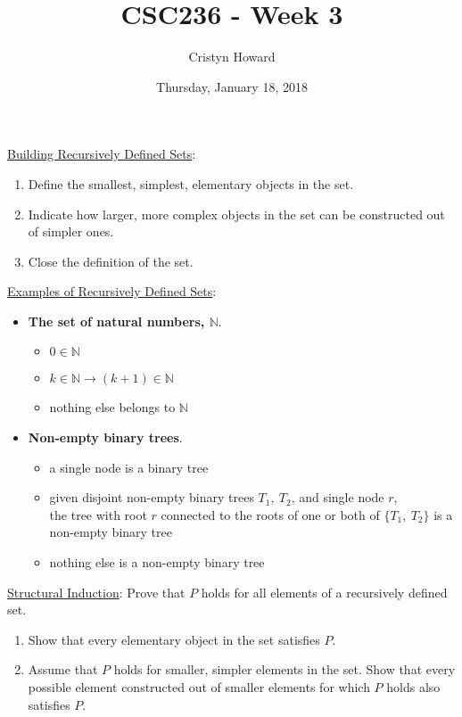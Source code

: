 \documentclass[12pt]{article}
\title{CSC236 - Week 3}
\author{Cristyn Howard}
\date{Thursday, January 18, 2018}
\begin{document}
\maketitle

\underline{Building Recursively Defined Sets}:
\begin{enumerate}
\item Define the smallest, simplest, elementary objects in the set.
\item Indicate how larger, more complex objects in the set can be constructed out of simpler ones.
\item Close the definition of the set.
\end{enumerate}
\vspace{0.5cm}

\underline{Examples of Recursively Defined Sets}:
\begin{itemize}
\item \textbf{The set of natural numbers, $\mathbb{N}$}.
	\begin{itemize}
	\item $0 \in \mathbb{N}$
	\item $k \in \mathbb{N} \rightarrow (k+1) \in \mathbb{N}$
	\item nothing else belongs to $\mathbb{N}$
	\end{itemize}

\item \textbf{Non-empty binary trees}.
	\begin{itemize}
	\item a single node is a binary tree
	\item given disjoint non-empty binary trees $T_1, \: T_2$, and single node $r$, \\ the tree with root $r$ connected to the roots of one or both of $\{T_1, \: T_2\}$ is a non-empty binary tree
	\item nothing else is a non-empty binary tree
	\end{itemize}
\end{itemize}
\vspace{0.5cm}

\underline{Structural Induction}: Prove that $P$ holds for all elements of a recursively defined set.
\begin{enumerate}
\item Show that every elementary object in the set satisfies $P$.
\item Assume that $P$ holds for smaller, simpler elements in the set. Show that every possible element constructed out of smaller elements for which $P$ holds also satisfies $P$.
\end{enumerate}
\vspace{0.5cm}
\end{document}
